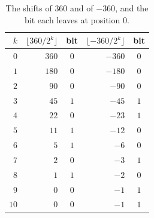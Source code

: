 \begin{table}[h!]
 \centering
 \begin{tabular}{@{}rrcrc@{}}
  \toprule
  $k$ & $\lfloor 360/2^k \rfloor$ & bit & $\lfloor -360/2^k \rfloor$ & bit \\
  \midrule
  $0$ & $360$ & $0$ & $-360$ & $0$ \\
  $1$ & $180$ & $0$ & $-180$ & $0$ \\
  $2$ & $90$ & $0$ & $-90$ & $0$ \\
  $3$ & $45$ & $1$ & $-45$ & $1$ \\
  $4$ & $22$ & $0$ & $-23$ & $1$ \\
  $5$ & $11$ & $1$ & $-12$ & $0$ \\
  $6$ & $5$ & $1$ & $-6$ & $0$ \\
  $7$ & $2$ & $0$ & $-3$ & $1$ \\
  $8$ & $1$ & $1$ & $-2$ & $0$ \\
  $9$ & $0$ & $0$ & $-1$ & $1$ \\
  $10$ & $0$ & $0$ & $-1$ & $1$ \\
  \bottomrule
 \end{tabular}
 \caption{The shifts of $360$ and of $-360$, and the bit each leaves at position $0$.}
 \label{tab.shiftsOf360}
\end{table}

